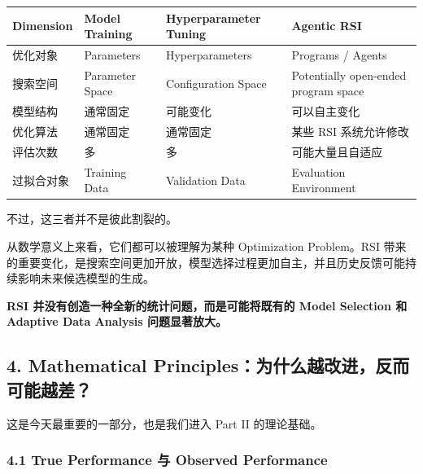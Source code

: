 \begin{readertable}
\begin{longtable}[]{@{}
  >{\raggedright\arraybackslash}p{}
  >{\raggedright\arraybackslash}p{}
  >{\raggedright\arraybackslash}p{}
  >{\raggedright\arraybackslash}p{}@{}}
\toprule
Dimension & Model Training & Hyperparameter Tuning & Agentic RSI \\
\midrule
\endhead
优化对象 & Parameters & Hyperparameters & Programs / Agents \\
搜索空间 & Parameter Space & Configuration Space & Potentially open-ended program space \\
模型结构 & 通常固定 & 可能变化 & 可以自主变化 \\
优化算法 & 通常固定 & 通常固定 & 某些 RSI 系统允许修改 \\
评估次数 & 多 & 多 & 可能大量且自适应 \\
过拟合对象 & Training Data & Validation Data & Evaluation Environment \\
\bottomrule
\end{longtable}
\end{readertable}

不过，这三者并不是彼此割裂的。

从数学意义上来看，它们都可以被理解为某种 Optimization Problem。RSI 带来的重要变化，是搜索空间更加开放，模型选择过程更加自主，并且历史反馈可能持续影响未来候选模型的生成。

\textbf{RSI 并没有创造一种全新的统计问题，而是可能将既有的 Model Selection 和 Adaptive Data Analysis 问题显著放大。}

\hypertarget{part-1-03-0001-mathematical-principlesux4e3aux4ec0ux4e48ux8d8aux6539ux8fdbux53cdux800cux53efux80fdux8d8aux5dee}{%
\subsection{4. Mathematical Principles：为什么越改进，反而可能越差？}\label{part-1-03-0001-mathematical-principlesux4e3aux4ec0ux4e48ux8d8aux6539ux8fdbux53cdux800cux53efux80fdux8d8aux5dee}}

这是今天最重要的一部分，也是我们进入 Part II 的理论基础。

\hypertarget{part-1-03-0001-true-performance-ux4e0e-observed-performance}{%
\subsubsection{4.1 True Performance 与 Observed Performance}\label{part-1-03-0001-true-performance-ux4e0e-observed-performance}}

